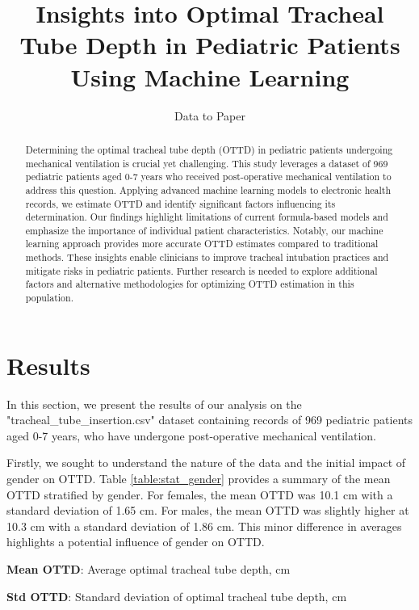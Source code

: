 \documentclass[11pt]{article}
\title{Insights into Optimal Tracheal Tube Depth in Pediatric Patients Using Machine Learning}
\author{Data to Paper}
\begin{document}
\maketitle
\begin{abstract}
Determining the optimal tracheal tube depth (OTTD) in pediatric patients undergoing mechanical ventilation is crucial yet challenging. This study leverages a dataset of 969 pediatric patients aged 0-7 years who received post-operative mechanical ventilation to address this question. Applying advanced machine learning models to electronic health records, we estimate OTTD and identify significant factors influencing its determination. Our findings highlight limitations of current formula-based models and emphasize the importance of individual patient characteristics. Notably, our machine learning approach provides more accurate OTTD estimates compared to traditional methods. These insights enable clinicians to improve tracheal intubation practices and mitigate risks in pediatric patients. Further research is needed to explore additional factors and alternative methodologies for optimizing OTTD estimation in this population.
\end{abstract}
\section*{Results}

In this section, we present the results of our analysis on the "tracheal\_tube\_insertion.csv" dataset containing records of 969 pediatric patients aged 0-7 years, who have undergone post-operative mechanical ventilation.

Firstly, we sought to understand the nature of the data and the initial impact of gender on OTTD. Table {}\ref{table:stat_gender} provides a summary of the mean OTTD stratified by gender. For females, the mean OTTD was 10.1 cm with a standard deviation of 1.65 cm. For males, the mean OTTD was slightly higher at 10.3 cm with a standard deviation of 1.86 cm. This minor difference in averages highlights a potential influence of gender on OTTD.

\begin{table}[h]
\caption{Descriptive statistics of optimal tracheal tube depth stratified by sex.}
\label{table:stat_gender}
\begin{threeparttable}
\renewcommand{\TPTminimum}{\linewidth}
\begin{tablenotes}
\footnotesize
\item \textbf{Mean OTTD}: Average optimal tracheal tube depth, cm
\item \textbf{Std OTTD}: Standard deviation of optimal tracheal tube depth, cm
\end{tablenotes}
\end{threeparttable}
\end{table}
\end{document}
